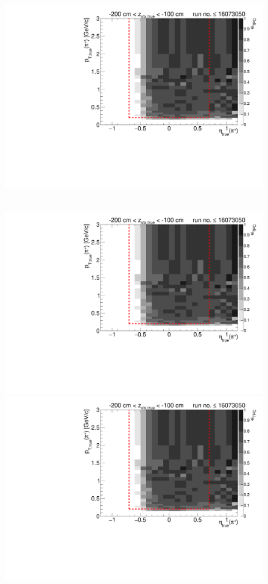 \begin{figure}[hb]
{  \includegraphics[width=\linewidth,page=17]{graphics/eff/Eff2D_TPC_pion_Plus_RunRange1.pdf}
}~
\parbox{0.495\textwidth}{
  \centering
  \includegraphics[width=\linewidth,page=12]{graphics/eff/Eff2D_TPC_pion_Plus_RunRange1.pdf}\\
  \includegraphics[width=\linewidth,page=14]{graphics/eff/Eff2D_TPC_pion_Plus_RunRange1.pdf}\\
}
\end{figure}
